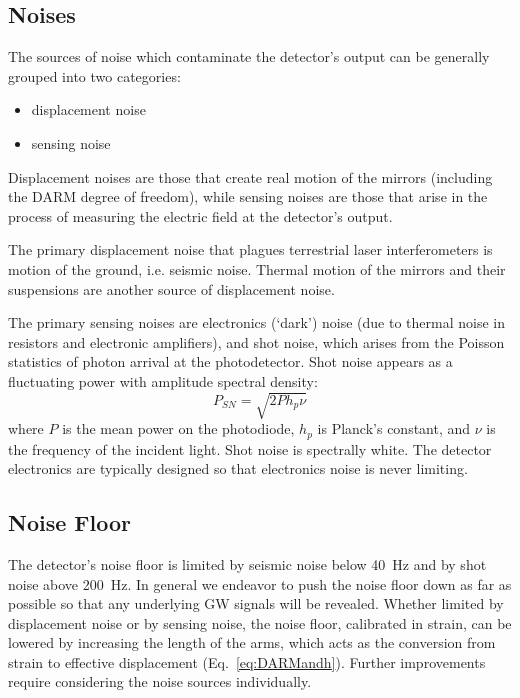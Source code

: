 \subsection{Noises}
The sources of noise which contaminate the detector's output can be 
generally grouped into two categories:
\begin{itemize}
\item displacement noise \vspace{-10 pt}
\item sensing noise
\end{itemize}
Displacement noises are those that create real motion of the mirrors
(including the DARM degree of freedom), while sensing noises are those
that arise in the process of measuring the electric field at the 
detector's output.

The primary displacement noise that plagues terrestrial laser
interferometers is motion of the ground, i.e. seismic noise.  Thermal
motion of the mirrors and their suspensions are another source of
displacement noise. 



The primary sensing noises are electronics (`dark') noise (due to
thermal noise in resistors and electronic amplifiers), and shot
noise, which arises from the Poisson statistics of photon arrival
at the photodetector. Shot noise appears as a
fluctuating power with amplitude spectral density:
\begin{equation}
P_{SN} = \sqrt{2 P h_p \nu}
\label{eq:shotnoise}
\end{equation}
where $P$ is the mean power on the photodiode, $h_p$ is Planck's
constant, and $\nu$ is the frequency of the incident light. Shot noise
is spectrally white.  The detector electronics are typically designed
so that electronics noise is never limiting.

\subsection{Noise Floor}
The detector's noise floor is limited by seismic noise below 40~Hz and
by shot noise above 200~Hz.   In general we endeavor to push the noise floor down as far as possible
so that any underlying GW signals will be revealed.  Whether
limited by displacement noise or by sensing noise, the noise floor,
calibrated in strain, can be lowered by increasing the length of the
arms, which acts as the conversion from strain to effective displacement
(Eq.~\ref{eq:DARMandh}).
Further improvements require considering the noise
sources individually.

